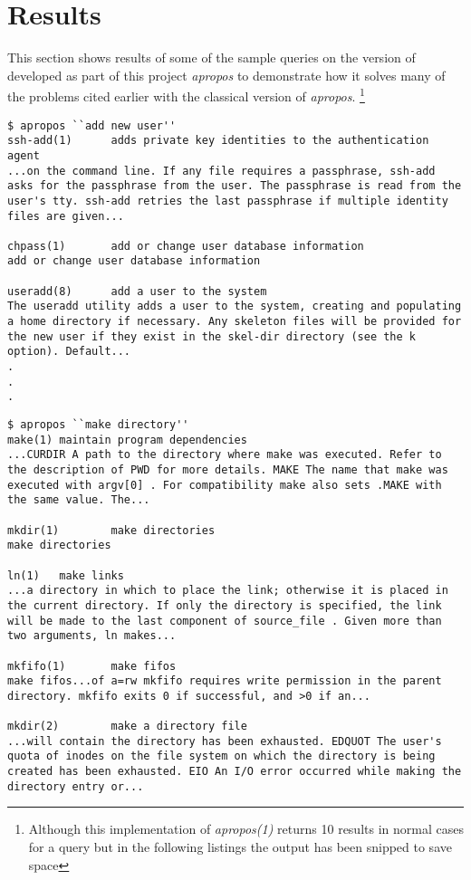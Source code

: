 \documentclass[titlepage, a4paper, 12pt]{article}
\begin{document}
\section{Results}
This section shows results of some of the sample queries on the version of
developed as part of this project
\textit{apropos} to demonstrate how it solves many of the problems cited earlier
with the classical version of \textit{apropos}.
\footnote{Although this implementation of \textit{apropos(1)} returns 10 results
in normal cases for a query but in the following listings the output has been
snipped to save space
}
\begin{lstlisting}
$ apropos ``add new user''
ssh-add(1)      adds private key identities to the authentication agent
...on the command line. If any file requires a passphrase, ssh-add
asks for the passphrase from the user. The passphrase is read from the
user's tty. ssh-add retries the last passphrase if multiple identity
files are given...

chpass(1)       add or change user database information
add or change user database information

useradd(8)      add a user to the system
The useradd utility adds a user to the system, creating and populating
a home directory if necessary. Any skeleton files will be provided for
the new user if they exist in the skel-dir directory (see the k
option). Default...
.
.
.
\end{lstlisting}
\begin{lstlisting}
$ apropos ``make directory''
make(1) maintain program dependencies
...CURDIR A path to the directory where make was executed. Refer to
the description of PWD for more details. MAKE The name that make was
executed with argv[0] . For compatibility make also sets .MAKE with
the same value. The...

mkdir(1)        make directories
make directories

ln(1)   make links
...a directory in which to place the link; otherwise it is placed in
the current directory. If only the directory is specified, the link
will be made to the last component of source_file . Given more than
two arguments, ln makes...

mkfifo(1)       make fifos
make fifos...of a=rw mkfifo requires write permission in the parent
directory. mkfifo exits 0 if successful, and >0 if an...

mkdir(2)        make a directory file
...will contain the directory has been exhausted. EDQUOT The user's
quota of inodes on the file system on which the directory is being
created has been exhausted. EIO An I/O error occurred while making the
directory entry or...
\end{lstlisting}
\end{document}
